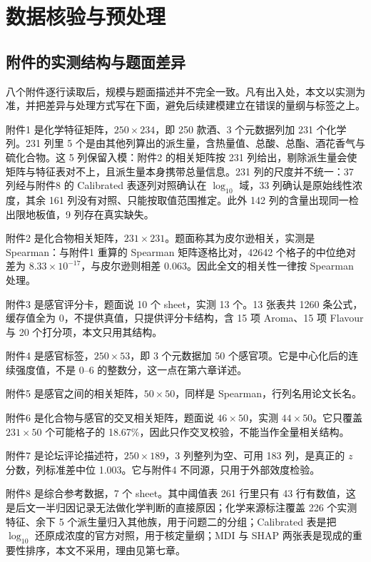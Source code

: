 \section{数据核验与预处理}

\subsection{附件的实测结构与题面差异}

八个附件逐行读取后，规模与题面描述并不完全一致。凡有出入处，本文以实测为准，并把差异与处理方式写在下面，避免后续建模建立在错误的量纲与标签之上。

附件1 是化学特征矩阵，$250\times234$，即 250 款酒、3 个元数据列加 231 个化学列。231 列里 5 个是由其他列算出的派生量，含热量值、总酸、总酯、酒花香气与硫化合物。这 5 列保留入模：附件2 的相关矩阵按 231 列给出，剔除派生量会使矩阵与特征表对不上，且派生量本身携带总量信息。231 列的尺度并不统一：37 列经与附件8 的 Calibrated 表逐列对照确认在 $\log_{10}$ 域，33 列确认是原始线性浓度，其余 161 列没有对照、只能按取值范围推定。此外 142 列的含量出现同一检出限地板值，9 列存在真实缺失。

附件2 是化合物相关矩阵，$231\times231$。题面称其为皮尔逊相关，实测是 Spearman：与附件1 重算的 Spearman 矩阵逐格比对，42642 个格子的中位绝对差为 $8.33\times10^{-17}$，与皮尔逊则相差 0.063。因此全文的相关性一律按 Spearman 处理。

附件3 是感官评分卡，题面说 10 个 sheet，实测 13 个。13 张表共 1260 条公式，缓存值全为 0，不提供真值，只提供评分卡结构，含 15 项 Aroma、15 项 Flavour 与 20 个打分项，本文只用其结构。

附件4 是感官标签，$250\times53$，即 3 个元数据加 50 个感官项。它是中心化后的连续强度值，不是 0--6 的整数分，这一点在第六章详述。

附件5 是感官之间的相关矩阵，$50\times50$，同样是 Spearman，行列名用论文长名。

附件6 是化合物与感官的交叉相关矩阵，题面说 $46\times50$，实测 $44\times50$。它只覆盖 $231\times50$ 个可能格子的 18.67\%，因此只作交叉校验，不能当作全量相关结构。

附件7 是论坛评论描述符，$250\times189$，3 列整列为空、可用 183 列，是真正的 $z$ 分数，列标准差中位 1.003。它与附件4 不同源，只用于外部效度检验。

附件8 是综合参考数据，7 个 sheet。其中阈值表 261 行里只有 43 行有数值，这是后文一半归因记录无法做化学判断的直接原因；化学来源标注覆盖 226 个实测特征、余下 5 个派生量归入其他族，用于问题二的分组；Calibrated 表是把 $\log_{10}$ 还原成浓度的官方对照，用于核定量纲；MDI 与 SHAP 两张表是现成的重要性排序，本文不采用，理由见第七章。

